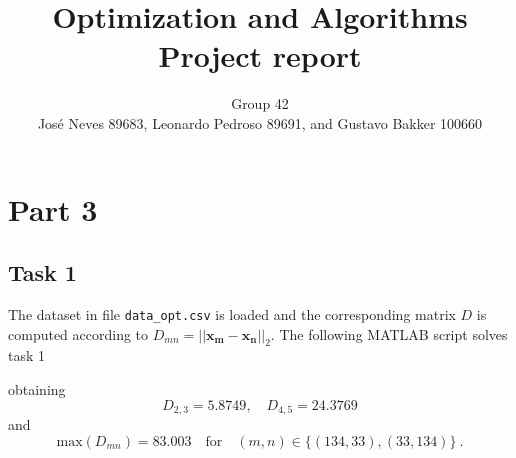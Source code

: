 \documentclass[12pt]{article}
\title{Optimization and Algorithms \\ Project report}
\author{Group 42 \\ Jos{\'e} Neves 89683, Leonardo Pedroso 89691, and Gustavo Bakker 100660}
\date{}
\begin{document}
\maketitle


\section{Part 3}
\subsection{Task 1}
The dataset in file \verb|data_opt.csv| is loaded and the corresponding matrix $D$ is computed according to $D_{mn} = ||\mathbf{x_m}-\mathbf{x_n}||_2$. The following MATLAB script solves task 1

obtaining 
\begin{equation*}\label{key}
D_{2,3} = 5.8749, \quad D_{4,5} = 24.3769
\end{equation*} 
and 
\begin{equation*}\label{key}
\mathrm{max}(D_{mn}) = 83.003 \quad \text{for} \quad (m,n) \in \{(134,33),(33,134)\}\:.
\end{equation*}
\end{document}
